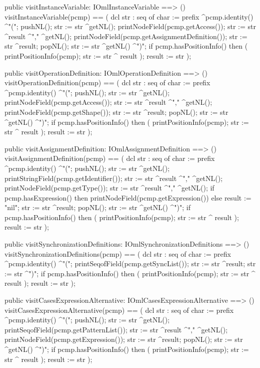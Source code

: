 \begin{vdm_al}
  public visitInstanceVariable: IOmlInstanceVariable ==> ()
  visitInstanceVariable(pcmp) ==
    ( dcl str : seq of char := prefix ^pcmp.identity() ^"(";
      pushNL();
      str := str ^getNL();
      printNodeField(pcmp.getAccess());
      str := str ^result ^"," ^getNL();
      printNodeField(pcmp.getAssignmentDefinition());
      str := str ^result;
      popNL();
      str := str ^getNL() ^")";
      if pcmp.hasPositionInfo()
      then ( printPositionInfo(pcmp);
             str := str ^ result );
      result := str );

  public visitOperationDefinition: IOmlOperationDefinition ==> ()
  visitOperationDefinition(pcmp) ==
    ( dcl str : seq of char := prefix ^pcmp.identity() ^"(";
      pushNL();
      str := str ^getNL();
      printNodeField(pcmp.getAccess());
      str := str ^result ^"," ^getNL();
      printNodeField(pcmp.getShape());
      str := str ^result;
      popNL();
      str := str ^getNL() ^")";
      if pcmp.hasPositionInfo()
      then ( printPositionInfo(pcmp);
             str := str ^ result );
      result := str );

  public visitAssignmentDefinition: IOmlAssignmentDefinition ==> ()
  visitAssignmentDefinition(pcmp) ==
    ( dcl str : seq of char := prefix ^pcmp.identity() ^"(";
      pushNL();
      str := str ^getNL();
      printStringField(pcmp.getIdentifier());
      str := str ^result ^"," ^getNL();
      printNodeField(pcmp.getType());
      str := str ^result ^"," ^getNL();
      if pcmp.hasExpression()
      then printNodeField(pcmp.getExpression())
      else result := "nil";
      str := str ^result;
      popNL();
      str := str ^getNL() ^")";
      if pcmp.hasPositionInfo()
      then ( printPositionInfo(pcmp);
             str := str ^ result );
      result := str );

  public visitSynchronizationDefinitions: IOmlSynchronizationDefinitions ==> ()
  visitSynchronizationDefinitions(pcmp) ==
    ( dcl str : seq of char := prefix ^pcmp.identity() ^"(";
      printSeqofField(pcmp.getSyncList());
      str := str ^result;
      str := str ^")";
      if pcmp.hasPositionInfo()
      then ( printPositionInfo(pcmp);
             str := str ^ result );
      result := str );

  public visitCasesExpressionAlternative: IOmlCasesExpressionAlternative ==> ()
  visitCasesExpressionAlternative(pcmp) ==
    ( dcl str : seq of char := prefix ^pcmp.identity() ^"(";
      pushNL();
      str := str ^getNL();
      printSeqofField(pcmp.getPatternList());
      str := str ^result ^"," ^getNL();
      printNodeField(pcmp.getExpression());
      str := str ^result;
      popNL();
      str := str ^getNL() ^")";
      if pcmp.hasPositionInfo()
      then ( printPositionInfo(pcmp);
             str := str ^ result );
      result := str );


\end{vdm_al}
